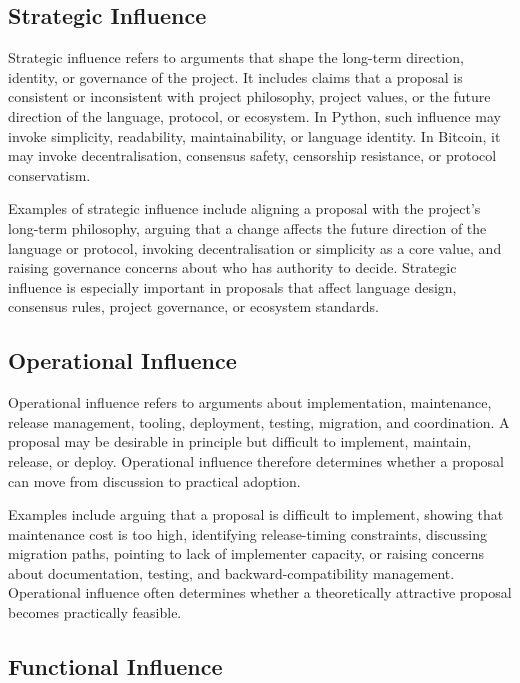 \documentclass[sigconf,screen]{acmart}
\begin{document}
\subsection{Strategic Influence}

Strategic influence refers to arguments that shape the long-term direction, identity, or governance of the project. It includes claims that a proposal is consistent or inconsistent with project philosophy, project values, or the future direction of the language, protocol, or ecosystem. In Python, such influence may invoke simplicity, readability, maintainability, or language identity. In Bitcoin, it may invoke decentralisation, consensus safety, censorship resistance, or protocol conservatism.

Examples of strategic influence include aligning a proposal with the project's long-term philosophy, arguing that a change affects the future direction of the language or protocol, invoking decentralisation or simplicity as a core value, and raising governance concerns about who has authority to decide. Strategic influence is especially important in proposals that affect language design, consensus rules, project governance, or ecosystem standards.

\subsection{Operational Influence}

Operational influence refers to arguments about implementation, maintenance, release management, tooling, deployment, testing, migration, and coordination. A proposal may be desirable in principle but difficult to implement, maintain, release, or deploy. Operational influence therefore determines whether a proposal can move from discussion to practical adoption.

Examples include arguing that a proposal is difficult to implement, showing that maintenance cost is too high, identifying release-timing constraints, discussing migration paths, pointing to lack of implementer capacity, or raising concerns about documentation, testing, and backward-compatibility management. Operational influence often determines whether a theoretically attractive proposal becomes practically feasible.

\subsection{Functional Influence}
\end{document}
